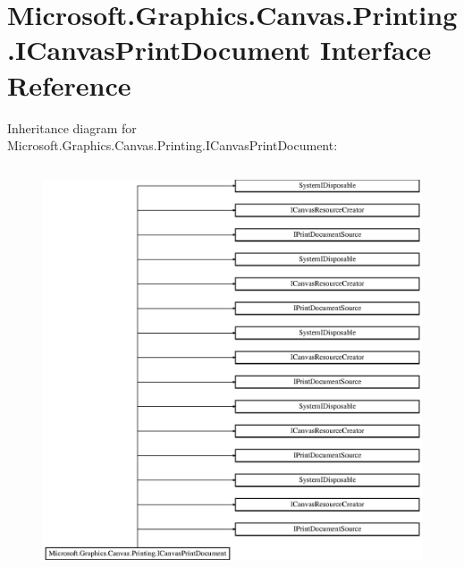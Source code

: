 \hypertarget{interface_microsoft_1_1_graphics_1_1_canvas_1_1_printing_1_1_i_canvas_print_document}{}\section{Microsoft.\+Graphics.\+Canvas.\+Printing.\+I\+Canvas\+Print\+Document Interface Reference}
\label{interface_microsoft_1_1_graphics_1_1_canvas_1_1_printing_1_1_i_canvas_print_document}
Inheritance diagram for Microsoft.\+Graphics.\+Canvas.\+Printing.\+I\+Canvas\+Print\+Document\+:\begin{figure}[H]
\begin{center}
\leavevmode
\includegraphics[height=12.000000cm]{interface_microsoft_1_1_graphics_1_1_canvas_1_1_printing_1_1_i_canvas_print_document}
\end{center}
\end{figure}
